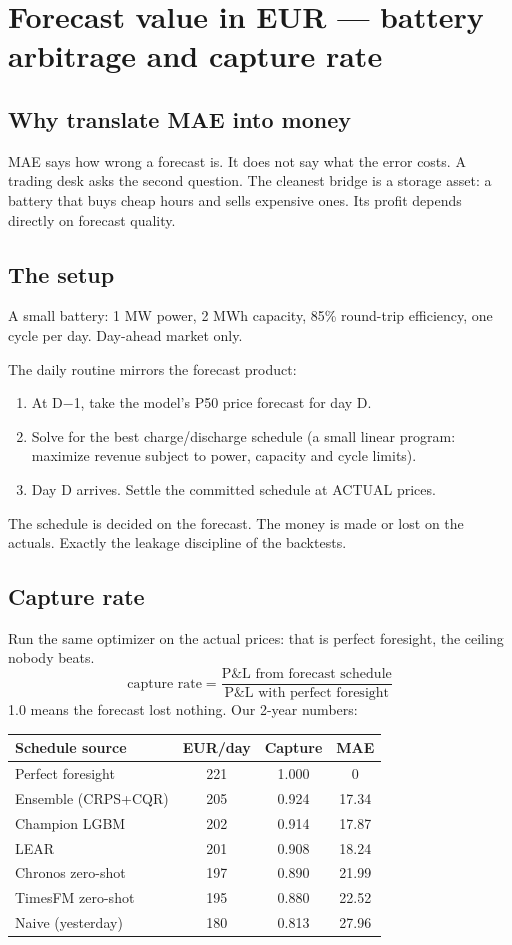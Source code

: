 \section{Forecast value in EUR --- battery arbitrage and capture rate}

\subsection{Why translate MAE into money}

MAE says how wrong a forecast is. It does not say what the error
costs. A trading desk asks the second question. The cleanest bridge
is a storage asset: a battery that buys cheap hours and sells
expensive ones. Its profit depends directly on forecast quality.

\subsection{The setup}

A small battery: 1 MW power, 2 MWh capacity, 85\% round-trip
efficiency, one cycle per day. Day-ahead market only.

The daily routine mirrors the forecast product:
\begin{enumerate}
\item At D$-$1, take the model's P50 price forecast for day D.
\item Solve for the best charge/discharge schedule (a small linear
      program: maximize revenue subject to power, capacity and
      cycle limits).
\item Day D arrives. Settle the committed schedule at ACTUAL prices.
\end{enumerate}
The schedule is decided on the forecast. The money is made or lost
on the actuals. Exactly the leakage discipline of the backtests.

\subsection{Capture rate}

Run the same optimizer on the actual prices: that is perfect
foresight, the ceiling nobody beats.
\[
\text{capture rate} = \frac{\text{P\&L from forecast schedule}}
                           {\text{P\&L with perfect foresight}}
\]
1.0 means the forecast lost nothing. Our 2-year numbers:

\begin{tabular}{lccc}
\hline
Schedule source & EUR/day & Capture & MAE \\
\hline
Perfect foresight & 221 & 1.000 & 0 \\
Ensemble (CRPS+CQR) & 205 & 0.924 & 17.34 \\
Champion LGBM & 202 & 0.914 & 17.87 \\
LEAR & 201 & 0.908 & 18.24 \\
Chronos zero-shot & 197 & 0.890 & 21.99 \\
TimesFM zero-shot & 195 & 0.880 & 22.52 \\
Naive (yesterday) & 180 & 0.813 & 27.96 \\
\hline
\end{tabular}

